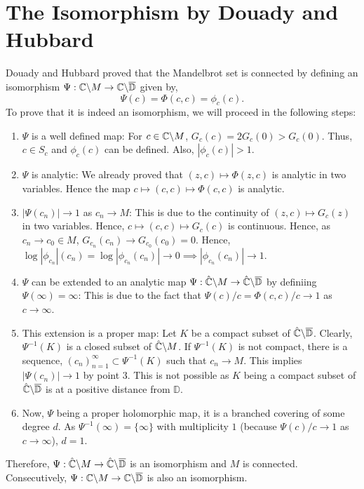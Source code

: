 \section{The Isomorphism by Douady and Hubbard}
Douady and Hubbard proved that the Mandelbrot set is connected by defining an isomorphism \( \Psi:\mathbb{C}\backslash M \to \mathbb{C}\backslash \overline{\mathbb{D}}  \) given by, \[
	\Psi(c)=\Phi(c,c)=\phi_c(c)
.\] 
To prove that it is indeed an isomorphism, we will proceed in the following steps:
\begin{enumerate}
	\item \( \Psi \) is a well defined map: For \( c\in \mathbb{C}\backslash M \), \( G_c(c)=2G_c(0)>G_c(0) \). Thus, \( c\in S_c \) and \( \phi_c(c) \) can be defined. Also, \( |\phi_c(c)|>1 \).
	\item \( \Psi \) is analytic: We already proved that \( (z,c)\mapsto \Phi(z,c) \) is analytic in two
		variables. Hence the map \( c\mapsto (c,c)\mapsto \Phi(c,c) \) is analytic.
	\item \( |\Psi(c_n)|\to 1 \) as \( c_n\to M \): This is due to the continuity of \( (z,c)\mapsto G_c(z) \) in two variables. Hence, \( c\mapsto (c,c)\mapsto G_c(c) \) is continuous. Hence, as \( c_n\to c_0\in M \), \( G_{c_n}(c_n)\to G_{c_0}(c_0)=0 \). Hence, \( \log |\phi_{c_n}|(c_n) = \log |\phi_{c_n}(c_n)|\to 0\implies|\phi_{c_n}(c_n)|\to 1  \).
	\item \( \Psi \) can be extended to an analytic map \( \Psi:\hat{\mathbb{C}}\backslash M\to \hat{\mathbb{C}}\backslash \overline{\mathbb{D}}  \) by definiing \( \Psi(\infty)=\infty \): This is due to the fact that \( \Psi(c) /c=\Phi(c,c) /c\to 1 \) as \( c\to \infty \).
	\item This extension is a proper map: Let \( K \) be a compact subset of \( \hat{\mathbb{C}}\backslash \overline{\mathbb{D}}  \). Clearly, \( \Psi^{-1}(K) \) is a closed subset of \( \hat{\mathbb{C}}\backslash M \). If \( \Psi^{-1}(K) \) is not compact, there is a sequence, \( (c_n)_{n=1}^\infty\subset \Psi^{-1}(K) \) such that \( c_n\to M \). This implies \( |\Psi(c_n)|\to 1 \) by point 3. This is not possible as \( K \) being a compact subset of \( \hat{\mathbb{C}}\backslash\overline{\mathbb{D}} \) is at a positive distance from \( \mathbb{D} \).
	\item Now, \( \Psi \) being a proper holomorphic map, it is a branched covering of some degree \( d \).
		As \( \Psi^{-1}(\infty)=\{\infty\} \) with multiplicity \( 1 \) (because \( \Psi(c) /c\to 1 \)
		as \( c\to \infty \)), \( d=1 \).
\end{enumerate}
Therefore, \( \Psi:\hat{\mathbb{C}}\backslash M\to \hat{\mathbb{C}}\backslash \overline{\mathbb{D}}  \) is an isomorphism and \( M \)
is connected. Consecutively, \( \Psi:\mathbb{C}\backslash M\to \mathbb{C}\backslash \overline{\mathbb{D}}  \) is 
also an isomorphism.
